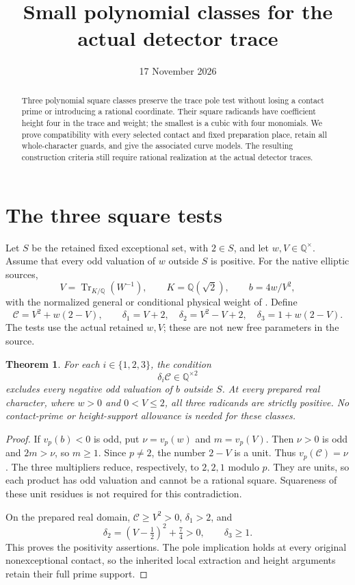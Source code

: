\documentclass[11pt,a4paper]{article}
\title{Small polynomial classes for the actual detector trace}
\author{}\date{17 November 2026}
\newtheorem{theorem}{Theorem}[section]
\newcommand{\Q}{\mathbb Q}\newcommand{\Z}{\mathbb Z}
\DeclareMathOperator{\Tr}{Tr}\DeclareMathOperator{\Nm}{N}
\begin{document}
\maketitle
\begin{abstract}
Three polynomial square classes preserve the trace pole test without
losing a contact prime or introducing a rational coordinate. Their
square radicands have coefficient height four in the trace and weight;
the smallest is a cubic with four monomials. We prove compatibility
with every selected contact and fixed preparation place, retain all
whole-character guards, and give the associated curve models. The
resulting construction criteria still require rational realization at
the actual detector traces.
\end{abstract}

\section{The three square tests}

Let $S$ be the retained fixed exceptional set, with $2\in S$, and
let $w,V\in\Q^\times$. Assume that every odd valuation of $w$
outside $S$ is positive. For the native elliptic sources,
\[
 V=\Tr_{K/\Q}(W^{-1}),\qquad K=\Q(\sqrt2),\qquad
 b=4w/V^2,
\]
with the normalized general or conditional physical weight of
\cite{Reweighted,Trace}. Define
\begin{equation}\label{eq:classes}
 \mathcal C=V^2+w(2-V),\qquad
 \delta_1=V+2,\quad
 \delta_2=V^2-V+2,\quad
 \delta_3=1+w(2-V).
\end{equation}
The tests use the actual retained $w,V$; these are not new free
parameters in the source.

\begin{theorem}\label{thm:pole}
For each $i\in\{1,2,3\}$, the condition
\[
                       \delta_i\mathcal C\in\Q^{\times2}
\]
excludes every negative odd valuation of $b$ outside $S$.
At every prepared real character, where $w>0$ and $0<V\le2$,
all three radicands are strictly positive. No contact-prime or
height-support allowance is needed for these classes.
\end{theorem}
\begin{proof}
If $v_p(b)<0$ is odd, put $\nu=v_p(w)$ and $m=v_p(V)$.
Then $\nu>0$ is odd and $2m>\nu$, so $m\ge1$. Since $p\ne2$,
the number $2-V$ is a unit. Thus $v_p(\mathcal C)=\nu$.
The three multipliers reduce, respectively, to $2,2,1$ modulo $p$.
They are units, so each product has odd valuation and cannot be
a rational square. Squareness of these unit residues is not
required for this contradiction.

On the prepared real domain, $\mathcal C\ge V^2>0$,
$\delta_1>2$, and
\[
 \delta_2=(V-\tfrac12)^2+\tfrac74>0,\qquad \delta_3\ge1.
\]
This proves the positivity assertions. The pole implication holds
at every original nonexceptional contact, so the inherited local
extraction and height arguments retain their full prime support.
\end{proof}
\end{document}
